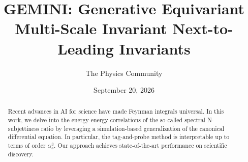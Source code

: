 \documentclass[11pt]{article}
\title{GEMINI: Generative Equivariant Multi-Scale Invariant Next-to-Leading Invariants}
\author{The Physics Community}
\date{September 20, 2026}
\numberwithin{equation}{section}
\theoremstyle{definition}
\theoremstyle{remark}
\begin{document}
\maketitle
\begin{abstract}
Recent advances in AI for science have made Feynman integrals universal.
In this work, we delve into the energy-energy correlations of the
so-called spectral N-subjettiness ratio by leveraging a simulation-based
generalization of the canonical differential equation. In particular,
the tag-and-probe method is interpretable up to terms of order
$\alpha_s^3$. Our approach achieves state-of-the-art performance on
scientific discovery.
\end{abstract}
\tableofcontents



\nocite{*}


\end{document}
